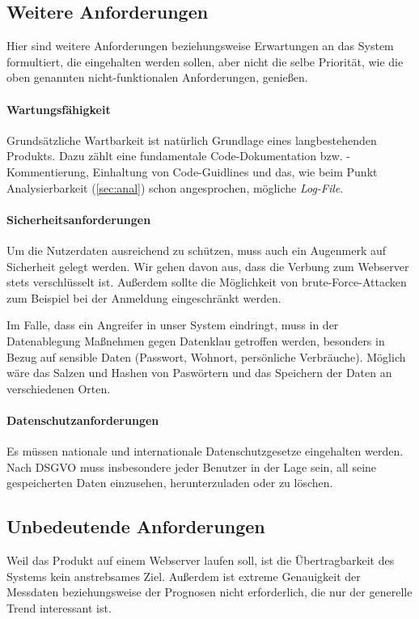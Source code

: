 \subsection{Weitere Anforderungen} \label{sec:other}
Hier sind weitere Anforderungen beziehungsweise Erwartungen an das System formultiert, die eingehalten werden sollen, aber nicht die selbe Priorität, wie die oben genannten nicht-funktionalen Anforderungen, genießen.
\paragraph{Wartungsfähigkeit}

Grundsätzliche Wartbarkeit ist natürlich Grundlage eines langbestehenden Produkts. Dazu zählt eine fundamentale Code-Dokumentation bzw. -Kommentierung, Einhaltung von Code-Guidlines und das, wie beim Punkt Analysierbarkeit (\ref{sec:anal}) schon angesprochen, mögliche \textit{Log-File}.


\paragraph{Sicherheitsanforderungen}
Um die Nutzerdaten ausreichend zu schützen, muss auch ein Augenmerk auf Sicherheit gelegt werden. Wir gehen davon aus, dass die Verbung zum Webserver stets verschlüsselt ist. Außerdem sollte die Möglichkeit von brute-Force-Attacken zum Beispiel bei der Anmeldung eingeschränkt werden.

Im Falle, dass ein Angreifer in unser System eindringt, muss in der Datenablegung Maßnehmen gegen Datenklau getroffen werden, besonders in Bezug auf sensible Daten (Passwort, Wohnort, persönliche Verbräuche). Möglich wäre das Salzen und Hashen von Paswörtern und das Speichern der Daten an verschiedenen Orten.

\paragraph{Datenschutzanforderungen}
Es müssen nationale und internationale Datenschutzgesetze eingehalten werden. Nach DSGVO muss insbesondere jeder Benutzer in der Lage sein, all seine gespeicherten Daten einzusehen, herunterzuladen oder zu löschen.

\subsection{Unbedeutende Anforderungen}
Weil das Produkt auf einem Webserver laufen soll, ist die Übertragbarkeit des Systems kein anstrebsames Ziel. Außerdem ist extreme Genauigkeit der Messdaten beziehungsweise der Prognosen nicht erforderlich, die nur der generelle Trend interessant ist.